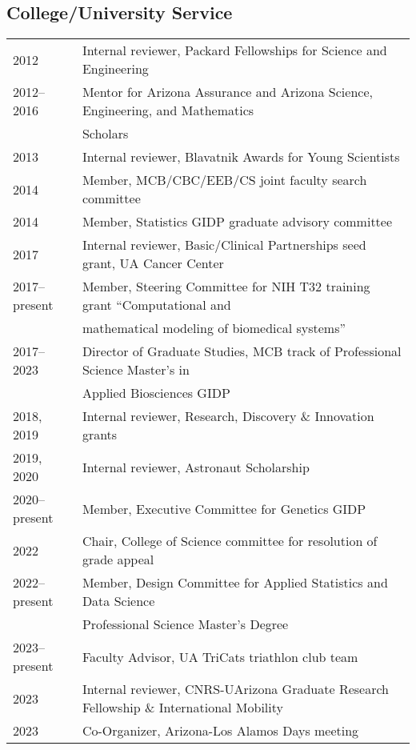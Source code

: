 \documentclass[11pt]{article}
\begin{document}
\subsection*{College/University Service}
\begin{longtable}[l]{l l}
2012 & Internal reviewer, Packard Fellowships for Science and Engineering\\
2012--2016 & Mentor for Arizona Assurance and Arizona Science, Engineering, and Mathematics\\
                        & Scholars\\
2013 & Internal reviewer, Blavatnik Awards for Young Scientists\\
2014 & Member, MCB/CBC/EEB/CS joint faculty search committee\\
2014 & Member, Statistics GIDP graduate advisory committee\\
2017 & Internal reviewer, Basic/Clinical Partnerships seed grant, UA Cancer Center\\
2017--present & Member, Steering Committee for NIH T32 training grant ``Computational and\\
&mathematical modeling of biomedical systems''\\
2017--2023 & Director of Graduate Studies, MCB track of Professional Science Master's in \\
& Applied Biosciences GIDP\\
2018, 2019 & Internal reviewer, Research, Discovery \& Innovation grants\\%
2019, 2020 & Internal reviewer, Astronaut Scholarship\\
2020--present & Member, Executive Committee for Genetics GIDP\\
2022 & Chair, College of Science committee for resolution of grade appeal\\
2022--present & Member, Design Committee for Applied Statistics and Data Science\\ & Professional Science Master's Degree\\
2023--present & Faculty Advisor, UA TriCats triathlon club team\\
2023 & Internal reviewer, CNRS-UArizona Graduate Research Fellowship \& International Mobility\\
2023 & Co-Organizer, Arizona-Los Alamos Days meeting
\end{longtable}
\end{document}
